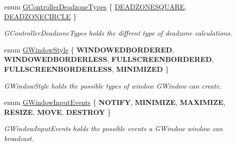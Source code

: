 \begin{DoxyCompactItemize}
enum \mbox{\hyperlink{namespace_g_w_1_1_s_y_s_t_e_m_a31011e5fdef70ea7c975794fe99319d4}{G\+Controller\+Deadzone\+Types}} \{ \mbox{\hyperlink{namespace_g_w_1_1_s_y_s_t_e_m_a31011e5fdef70ea7c975794fe99319d4a2607a103270014a3cd2944001009848a}{D\+E\+A\+D\+Z\+O\+N\+E\+S\+Q\+U\+A\+RE}}, 
\mbox{\hyperlink{namespace_g_w_1_1_s_y_s_t_e_m_a31011e5fdef70ea7c975794fe99319d4a96eca15634dfc446bcbf235e559052fa}{D\+E\+A\+D\+Z\+O\+N\+E\+C\+I\+R\+C\+LE}}
 \}
\begin{DoxyCompactList}\small\item\em G\+Controller\+Deadzone\+Types holds the diffrent type of deadzone calculations. \end{DoxyCompactList}\item 
\mbox{\label{namespace_g_w_1_1_s_y_s_t_e_m_ad117891e556631f842625c348d36a071}} 
enum \mbox{\hyperlink{namespace_g_w_1_1_s_y_s_t_e_m_ad117891e556631f842625c348d36a071}{G\+Window\+Style}} \{ \newline
{\bfseries W\+I\+N\+D\+O\+W\+E\+D\+B\+O\+R\+D\+E\+R\+ED}, 
{\bfseries W\+I\+N\+D\+O\+W\+E\+D\+B\+O\+R\+D\+E\+R\+L\+E\+SS}, 
{\bfseries F\+U\+L\+L\+S\+C\+R\+E\+E\+N\+B\+O\+R\+D\+E\+R\+ED}, 
{\bfseries F\+U\+L\+L\+S\+C\+R\+E\+E\+N\+B\+O\+R\+D\+E\+R\+L\+E\+SS}, 
\newline
{\bfseries M\+I\+N\+I\+M\+I\+Z\+ED}
 \}
\begin{DoxyCompactList}\small\item\em G\+Window\+Style holds the possible types of window G\+Window can create. \end{DoxyCompactList}\item 
\mbox{\label{namespace_g_w_1_1_s_y_s_t_e_m_a7d3a00c7f94541cb6f446fde944ab309}} 
enum \mbox{\hyperlink{namespace_g_w_1_1_s_y_s_t_e_m_a7d3a00c7f94541cb6f446fde944ab309}{G\+Window\+Input\+Events}} \{ \newline
{\bfseries N\+O\+T\+I\+FY}, 
{\bfseries M\+I\+N\+I\+M\+I\+ZE}, 
{\bfseries M\+A\+X\+I\+M\+I\+ZE}, 
{\bfseries R\+E\+S\+I\+ZE}, 
\newline
{\bfseries M\+O\+VE}, 
{\bfseries D\+E\+S\+T\+R\+OY}
 \}
\begin{DoxyCompactList}\small\item\em G\+Window\+Input\+Events holds the possible events a G\+Window window can broadcast. \end{DoxyCompactList}\end{DoxyCompactItemize}
